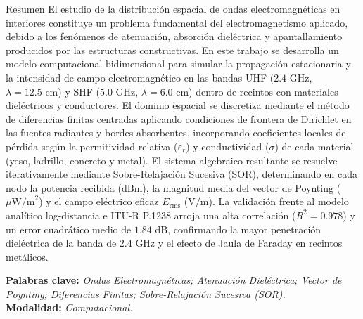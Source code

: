 \documentclass[final]{beamer}
\begin{document}
\begin{frame}[t]
		\begin{block}{Resumen}
			El estudio de la distribución espacial de ondas electromagnéticas en interiores constituye un problema fundamental del electromagnetismo aplicado, debido a los fenómenos de atenuación, absorción dieléctrica y apantallamiento producidos por las estructuras constructivas. En este trabajo se desarrolla un modelo computacional bidimensional para simular la propagación estacionaria y la intensidad de campo electromagnético en las bandas UHF (\(2.4\text{ GHz}\), \(\lambda = 12.5\text{ cm}\)) y SHF (\(5.0\text{ GHz}\), \(\lambda = 6.0\text{ cm}\)) dentro de recintos con materiales dieléctricos y conductores. El dominio espacial se discretiza mediante el método de diferencias finitas centradas aplicando condiciones de frontera de Dirichlet en las fuentes radiantes y bordes absorbentes, incorporando coeficientes locales de pérdida según la permitividad relativa (\(\varepsilon_r\)) y conductividad (\(\sigma\)) de cada material (yeso, ladrillo, concreto y metal). El sistema algebraico resultante se resuelve iterativamente mediante Sobre-Relajación Sucesiva (SOR), determinando en cada nodo la potencia recibida (\(\text{dBm}\)), la magnitud media del vector de Poynting (\(\mu\text{W/m}^2\)) y el campo eléctrico eficaz \(E_{\text{rms}}\) (\(\text{V/m}\)). La validación frente al modelo analítico log-distancia e ITU-R P.1238 arroja una alta correlación (\(R^2 = 0.978\)) y un error cuadrático medio de \(1.84\text{ dB}\), confirmando la mayor penetración dieléctrica de la banda de \(2.4\text{ GHz}\) y el efecto de Jaula de Faraday en recintos metálicos.
			
			\vspace{0.25cm}
			\textbf{Palabras clave:} \textit{Ondas Electromagnéticas; Atenuación Dieléctrica; Vector de Poynting; Diferencias Finitas; Sobre-Relajación Sucesiva (SOR).}\\
			\textbf{Modalidad:} \textit{Computacional.}
		\end{block}
		
		\vspace{0.3cm}
		
		\begin{columns}[t]
			

\end{columns}
\end{frame}
\end{document}
